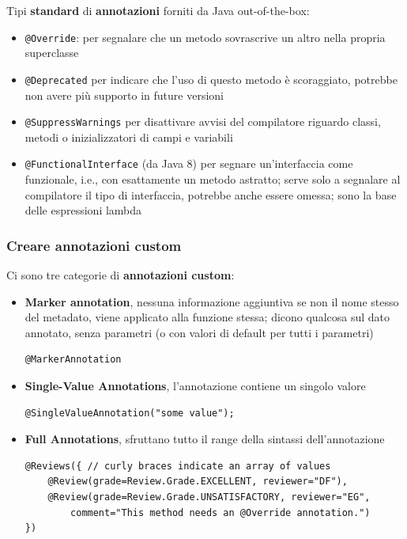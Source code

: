 Tipi \textbf{standard} di \textbf{annotazioni} forniti da Java out-of-the-box:
\begin{itemize}
    \item \texttt{@Override}: per segnalare che un metodo sovrascrive un altro nella propria superclasse

    \item \texttt{@Deprecated} per indicare che l'uso di questo metodo è scoraggiato, potrebbe non avere più supporto in future versioni

    \item \texttt{@SuppressWarnings} per disattivare avvisi del compilatore riguardo classi, metodi o inizializzatori di campi e variabili

    \item \texttt{@FunctionalInterface} (da Java 8) per segnare un'interfaccia come funzionale, i.e., con esattamente un metodo astratto; serve solo a segnalare al compilatore il tipo di interfaccia, potrebbe anche essere omessa; sono la base delle espressioni lambda
\end{itemize}

\subsubsection{Creare annotazioni custom}

Ci sono tre categorie di \textbf{annotazioni custom}:
\begin{itemize}
    \item \textbf{Marker annotation}, nessuna informazione aggiuntiva se non il nome stesso del metadato, viene applicato alla funzione stessa; dicono qualcosa sul dato annotato, senza parametri (o con valori di default per tutti i parametri)
    \begin{verbatim}
@MarkerAnnotation
    \end{verbatim}

    \item \textbf{Single-Value Annotations}, l'annotazione contiene un singolo valore
    \begin{verbatim}
@SingleValueAnnotation("some value");
    \end{verbatim}

    \item \textbf{Full Annotations}, sfruttano tutto il range della sintassi dell'annotazione
    \begin{verbatim}
@Reviews({ // curly braces indicate an array of values
    @Review(grade=Review.Grade.EXCELLENT, reviewer="DF"),
    @Review(grade=Review.Grade.UNSATISFACTORY, reviewer="EG",
        comment="This method needs an @Override annotation.")
})
    \end{verbatim}
\end{itemize}


